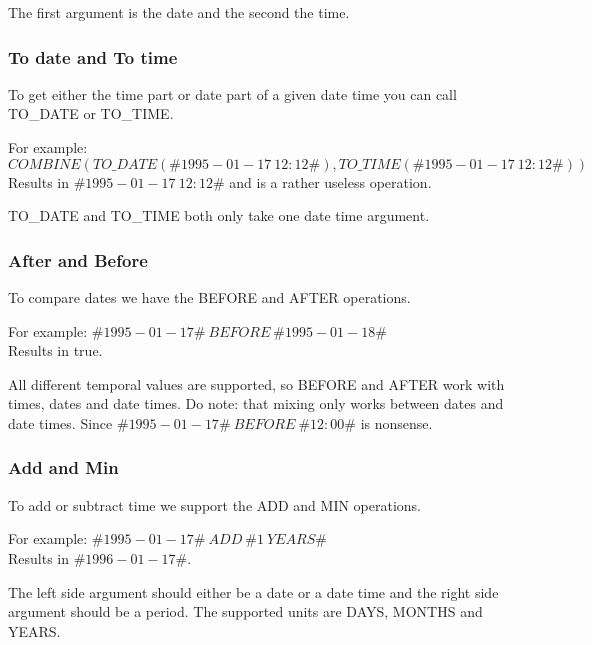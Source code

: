 The first argument is the date and the second the time.

\subsubsection{To date and To time}
To get either the time part or date part of a given date time you can call TO\_DATE or TO\_TIME.

For example:
$COMBINE(TO\_DATE(\#1995-01-17\ 12:12\#), TO\_TIME(\#1995-01-17\ 12:12\#))$ \\
Results in $\#1995-01-17\ 12:12\#$ and is a rather useless operation.

TO\_DATE and TO\_TIME both only take one date time argument.

\subsubsection{After and Before}
To compare dates we have the BEFORE and AFTER operations.

For example:
$\#1995-01-17\#\ BEFORE\ \#1995-01-18\#$ \\
Results in true.

All different temporal values are supported, so BEFORE and AFTER work with times, dates and date times. Do note: that mixing only works between dates and date times. Since $\#1995-01-17\#\ BEFORE\ \#12:00\#$ is nonsense.

\subsubsection{Add and Min}
To add or subtract time we support the ADD and MIN operations.

For example:
$\#1995-01-17\#\ ADD\ \#1\ YEARS\#$ \\
Results in $\#1996-01-17\#$.

The left side argument should either be a date or a date time and the right side argument should be a period. The supported units are DAYS, MONTHS and YEARS.